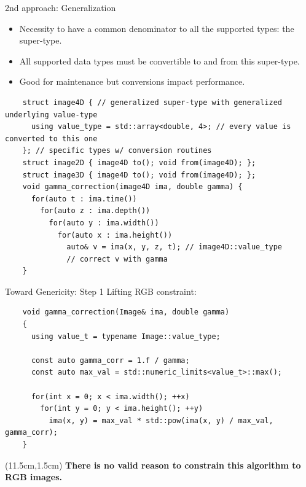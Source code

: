 \documentclass[12pt,aspectratio=169]{beamer}
\begin{document}
\begin{frame}[fragile]{2nd approach: Generalization}
  \begin{itemize}
    \item Necessity to have a common denominator to all the supported types: the super-type.
    \item All supported data types must be convertible to and from this super-type.
    \item Good for maintenance but conversions impact performance.
  \end{itemize}
  \begin{verbatim}
    struct image4D { // generalized super-type with generalized underlying value-type
      using value_type = std::array<double, 4>; // every value is converted to this one
    }; // specific types w/ conversion routines
    struct image2D { image4D to(); void from(image4D); };
    struct image3D { image4D to(); void from(image4D); };
    void gamma_correction(image4D ima, double gamma) {
      for(auto t : ima.time())
        for(auto z : ima.depth())
          for(auto y : ima.width())
            for(auto x : ima.height())
              auto& v = ima(x, y, z, t); // image4D::value_type
              // correct v with gamma
    }
  \end{verbatim}
\end{frame}

\begin{frame}[fragile]{Toward Genericity: Step 1}
  Lifting RGB constraint:
  \begin{verbatim}
    void gamma_correction(Image& ima, double gamma)
    {
      using value_t = typename Image::value_type;

      const auto gamma_corr = 1.f / gamma;
      const auto max_val = std::numeric_limits<value_t>::max();
    
      for(int x = 0; x < ima.width(); ++x)
        for(int y = 0; y < ima.height(); ++y)
          ima(x, y) = max_val * std::pow(ima(x, y) / max_val, gamma_corr);
    }
  \end{verbatim}
  \begin{textblock*}{4cm}(11.5cm,1.5cm)
    \textbf{There is no valid reason to constrain this algorithm to RGB images.}
  \end{textblock*}
\end{frame}
\end{document}
